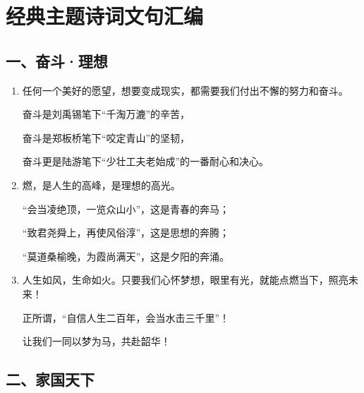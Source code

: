 \chapter{经典主题诗词文句汇编}

\section*{一、奋斗·理想}

\begin{enumerate}[leftmargin=*]
    \item 任何一个美好的愿望，想要变成现实，都需要我们付出不懈的努力和奋斗。
    
    奋斗是刘禹锡笔下“千淘万漉”的辛苦，
    
    奋斗是郑板桥笔下“咬定青山”的坚韧，
    
    奋斗更是陆游笔下“少壮工夫老始成”的一番耐心和决心。
    
    \item 燃，是人生的高峰，是理想的高光。
    
    “会当凌绝顶，一览众山小”，这是青春的奔马；
    
    “致君尧舜上，再使风俗淳”，这是思想的奔腾；
    
    “莫道桑榆晚，为霞尚满天”，这是夕阳的奔涌。
    
    \item 人生如风，生命如火。只要我们心怀梦想，眼里有光，就能点燃当下，照亮未来！
    
    正所谓，“自信人生二百年，会当水击三千里”！
    
    让我们一同以梦为马，共赴韶华！
\end{enumerate}

\newpage

\section*{二、家国天下}

